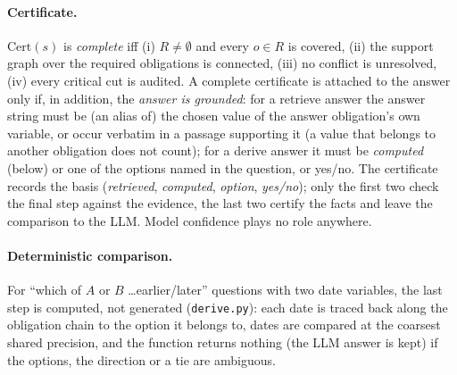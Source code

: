 \paragraph{Certificate.} $\mathrm{Cert}(s)$ is \emph{complete} iff (i) $R\neq\emptyset$ and every $o\in R$ is covered, (ii) the support graph over the required
obligations is connected, (iii) no conflict is unresolved, (iv) every critical cut is audited. A complete certificate is attached to the answer only if, in
addition, the \emph{answer is grounded}: for a \textsf{retrieve} answer the answer string must be (an alias of) the chosen value of the answer
obligation's own variable, or occur verbatim in a passage supporting it (a value that belongs to another obligation does not count); for a \textsf{derive}
answer it must be \emph{computed} (below) or one of the options named in the question, or yes/no. The certificate records the basis (\emph{retrieved},
\emph{computed}, \emph{option}, \emph{yes/no}); only the first two check the final step against the evidence, the last two certify the facts and leave the
comparison to the LLM. Model confidence plays no role anywhere.

\paragraph{Deterministic comparison.} For ``which of $A$ or $B$ \ldots earlier/later'' questions with two date variables, the last step is computed, not
generated (\texttt{derive.py}): each date is traced back along the obligation chain to the option it belongs to, dates are compared at the coarsest
shared precision, and the function returns nothing (the LLM answer is kept) if the options, the direction or a tie are ambiguous.

